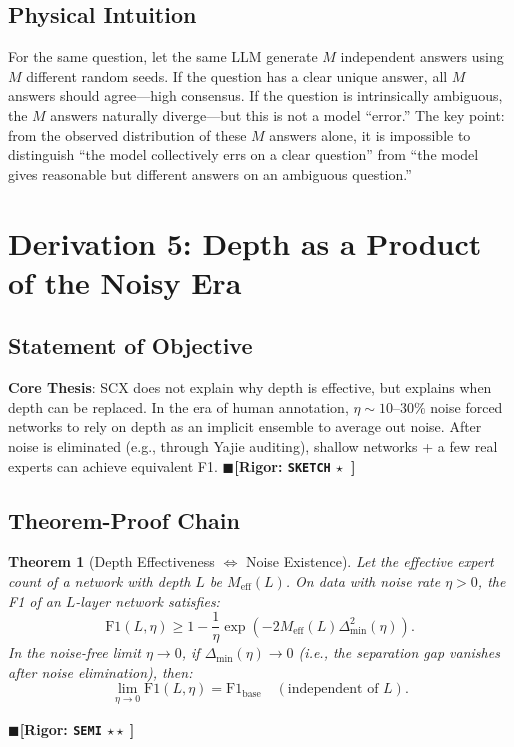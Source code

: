 \documentclass[12pt,a4paper]{article}
\newtheorem{theorem}{Theorem}[section]
\theoremstyle{definition}
\theoremstyle{remark}
\newcommand{\rigorSemi}{$\blacksquare$\;\textbf{[Rigor: \texttt{SEMI} $\star\star\;$]}}
\newcommand{\rigorSketch}{$\blacksquare$\;\textbf{[Rigor: \texttt{SKETCH} $\star\;\;$]}}
\begin{document}
\subsection{Physical Intuition}
For the same question, let the same LLM generate $M$ independent answers using $M$ different random seeds. If the question has a clear unique answer, all $M$ answers should agree---high consensus. If the question is intrinsically ambiguous, the $M$ answers naturally diverge---but this is not a model ``error.'' The key point: from the observed distribution of these $M$ answers alone, it is impossible to distinguish ``the model collectively errs on a clear question'' from ``the model gives reasonable but different answers on an ambiguous question.''

\section{Derivation 5: Depth as a Product of the Noisy Era}
\label{sec:depth-noise}

\subsection{Statement of Objective}
\textbf{Core Thesis}: SCX does not explain why depth is effective, but explains when depth can be replaced. In the era of human annotation, $\eta \sim 10$--$30\%$ noise forced networks to rely on depth as an implicit ensemble to average out noise. After noise is eliminated (e.g., through Yajie auditing), shallow networks + a few real experts can achieve equivalent F1.
\rigorSketch

\subsection{Theorem-Proof Chain}

\begin{theorem}[Depth Effectiveness $\iff$ Noise Existence]
\label{thm:6.1}
Let the effective expert count of a network with depth $L$ be $M_{\text{eff}}(L)$. On data with noise rate $\eta > 0$, the F1 of an $L$-layer network satisfies:
\begin{equation}
\mathrm{F1}(L, \eta) \geq 1 - \frac{1}{\eta}\exp(-2M_{\text{eff}}(L)\Delta_{\min}^2(\eta)).
\end{equation}
In the noise-free limit $\eta \to 0$, if $\Delta_{\min}(\eta) \to 0$ (i.e., the separation gap vanishes after noise elimination), then:
\begin{equation}
\lim_{\eta \to 0} \mathrm{F1}(L, \eta) = \mathrm{F1}_{\text{base}} \quad (\text{independent of }L).
\end{equation}
\end{theorem}
\rigorSemi
\end{document}
